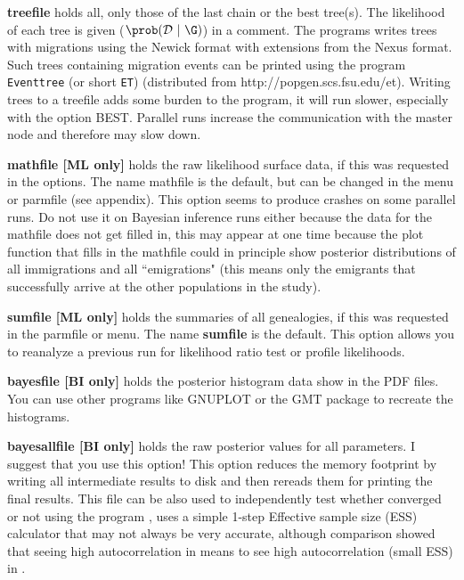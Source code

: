 \begin{description}
\item{\bf treefile} holds all, only those of the last chain or 
the best tree(s). The likelihood of each tree is given ($\prob(\mathcal D\ |\ \G)$) in a comment. The programs writes trees with migrations using the Newick format with extensions from the Nexus format. Such trees containing migration events can be printed using the program \texttt{Eventtree} (or short \texttt{ET}) (distributed from http://popgen.scs.fsu.edu/et).
Writing trees to a treefile adds
some burden to the program, it will run slower, especially with the option BEST. Parallel runs increase the communication with the master node and therefore may slow down. 

\item{\bf mathfile [ML only]} holds the raw likelihood surface data, if this was requested in the options. The name mathfile is the default, but can be changed in the menu or parmfile (see appendix). This option seems to produce crashes on some parallel runs. Do not use it on Bayesian inference runs either because the data for the mathfile does not get filled in, this may appear at one time because the plot function that fills in the mathfile could in principle show posterior distributions of all immigrations and all ``emigrations" (this means only the emigrants that successfully arrive at the other populations in the study).

\item{\bf sumfile [ML only]} holds the summaries of all genealogies, if this was requested in the parmfile or menu. The name \textbf{sumfile} is the default. This option allows you to reanalyze a previous run for likelihood ratio test or profile likelihoods.

\item{\bf bayesfile [BI only]} holds the posterior histogram data show in the PDF files. You can use other programs like GNUPLOT or the GMT package to recreate the histograms.
\item{\bf bayesallfile [BI only]} holds the raw posterior values for all parameters. I suggest that you use this option! This option reduces the memory footprint by writing all intermediate results to disk and then rereads them for printing the final results. This file can be also used to independently test whether \migrate converged or not using the program \tracer \citep{Rambaut:2007,Drummond:2007}, \migrate uses a simple 1-step Effective sample size (ESS) calculator that may not always be very accurate, although comparison showed that seeing high autocorrelation in \migrate means to see high autocorrelation (small ESS) in \tracer.


\end{description}
